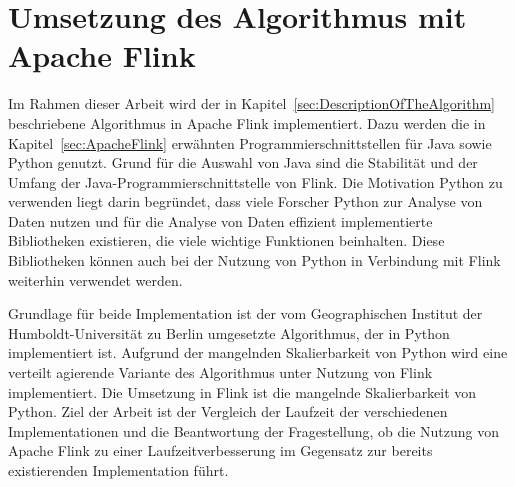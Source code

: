 \section{Umsetzung des Algorithmus mit Apache Flink}
\label{sec:ImplementationFlinkDescription}
Im Rahmen dieser Arbeit wird der in Kapitel~\ref{sec:DescriptionOfTheAlgorithm} beschriebene Algorithmus in Apache Flink implementiert. Dazu werden die in Kapitel~\ref{sec:ApacheFlink} erwähnten Programmierschnittstellen für Java sowie Python genutzt. Grund für die Auswahl von Java sind die Stabilität und der Umfang der Java-Programmierschnittstelle von Flink. Die Motivation Python zu verwenden liegt darin begründet, dass viele Forscher Python zur Analyse von Daten nutzen und für die Analyse von Daten effizient implementierte Bibliotheken existieren, die viele wichtige Funktionen beinhalten. Diese Bibliotheken können auch bei der Nutzung von Python in Verbindung mit Flink weiterhin verwendet werden. 

Grundlage für beide Implementation ist der vom Geographischen Institut der Humboldt-Universität zu Berlin umgesetzte Algorithmus, der in Python implementiert ist. Aufgrund der mangelnden Skalierbarkeit von Python wird eine verteilt agierende Variante des Algorithmus unter Nutzung von Flink implementiert. Die Umsetzung in Flink ist die mangelnde Skalierbarkeit von Python. Ziel der Arbeit ist der Vergleich der Laufzeit der verschiedenen Implementationen und die Beantwortung der Fragestellung, ob die Nutzung von Apache Flink zu einer Laufzeitverbesserung im Gegensatz zur bereits existierenden Implementation führt.

